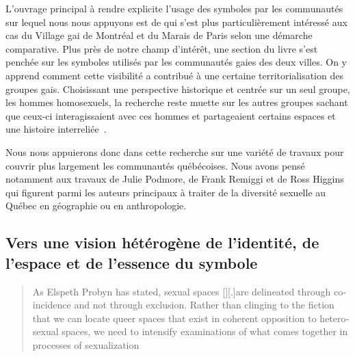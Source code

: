 L'ouvrage principal à rendre explicite l'usage des symboles par les communautés \lgbt{} sur lequel nous nous appuyons est  de \citet{Giraud2014} qui s'est plus particulièrement intéressé aux cas du Village gai de Montréal et du Marais de Paris selon une démarche comparative.
Plus près de notre champ d'intérêt, une section du livre s'est penchée sur les symboles utilisés par les communautés gaies des deux villes.
On y apprend comment cette visibilité a contribué à une certaine territorialisation des groupes gais.
Choisissant une perspective historique et centrée sur un seul groupe, les hommes homosexuels, la recherche reste muette sur les autres groupes \lgbt{} sachant que ceux-ci interagissaient avec ces hommes et partageaient certains espaces et une histoire interreliée~\citep{Remiggi2000,Demczuk1998,Podmore2001,Higgins1997,Higgins1999}.

Nous nous appuierons donc dans cette recherche sur une variété de travaux pour couvrir plus largement les communautés \lgbt{} québécoises.
Nous avons pensé notamment aux travaux de Julie Podmore, de Frank Remiggi et de Ross Higgins qui figurent parmi les auteurs principaux à traiter de la diversité sexuelle au Québec en géographie ou en anthropologie.

\subsection{Vers une vision hétérogène de l'identité, de l'espace et de l'essence du symbole}
\label{sec:vers_une_vision_h_t_rog_ne_de_l_identit_de_l_espace_et_de_l_essence_du_symbole}
 \foreignblockquote{english}[{\cite[tel que cité
dans][97]{Oswin2008}}][.]{As Elspeth Probyn has stated, sexual spaces [{\citeyear[10]{Probyn1996}}][.]{are delineated through coincidence and not through exclusion}. Rather than clinging to the fiction that we can locate queer spaces that exist in coherent opposition to heterosexual spaces, we need to intensify examinations of what comes together in processes of sexualization}


